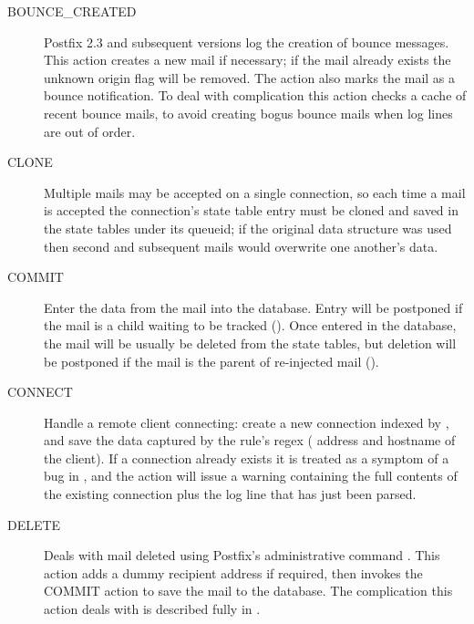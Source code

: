 \begin{description}

    \item [BOUNCE\_CREATED] Postfix 2.3 and subsequent versions log the
        creation of bounce messages.  This action creates a new mail if
        necessary; if the mail already exists the unknown origin flag will
        be removed.  The action also marks the mail as a bounce
        notification.  To deal with complication  this
        action checks a cache of recent bounce mails, to avoid creating
        bogus bounce mails when log lines are out of order.

    \item [CLONE] Multiple mails may be accepted on a single connection, so
        each time a mail is accepted the connection's state table entry
        must be cloned and saved in the state tables under its queueid; if
        the original data structure was used then second and subsequent
        mails would overwrite one another's data.

    \item [COMMIT] Enter the data from the mail into the database.  Entry
        will be postponed if the mail is a child waiting to be tracked
        ().  Once entered in the database,
        the mail will be usually be deleted from the state tables, but
        deletion will be postponed if the mail is the parent of re-injected
        mail ().

    \item [CONNECT] Handle a remote client connecting: create a new
        connection indexed by  , and save the
        data captured by the rule's regex ( address and
        hostname of the client).  If a connection already exists it is
        treated as a symptom of a bug in \parsername{}, and the action will
        issue a warning containing the full contents of the existing
        connection plus the log line that has just been parsed.

    \item [DELETE] Deals with mail deleted using Postfix's administrative
        command .  This action adds a dummy recipient
        address if required, then invokes the COMMIT action to save the
        mail to the database.  The complication this action deals with is
        described fully in .


\end{description}
